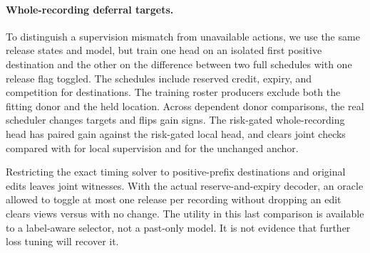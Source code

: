 \paragraph{Whole-recording deferral targets.}
To distinguish a supervision mismatch from unavailable actions, we use
the same release states and model, but train one head on an isolated
first positive destination and the other on the difference between
two full schedules with one release flag toggled. The schedules include
reserved credit, expiry, and competition for destinations. The training
roster producers exclude both the fitting donor and the held location.
Across \LedgerLabels{} dependent donor comparisons, the real scheduler
changes \LedgerChanged{} targets and flips \LedgerSigns{} gain signs.
The risk-gated whole-recording head has paired gain \LedgerEffect{}
against the risk-gated local head, and clears \LedgerJoint{} joint
checks compared with \LedgerLocal{} for local supervision and
\LedgerAnchor{} for the unchanged anchor.

Restricting the exact timing solver to positive-prefix destinations and
original edits leaves \LedgerRestricted{} joint witnesses. With the
actual reserve-and-expiry decoder, an oracle allowed to toggle at most
one release per recording without dropping an edit clears \LedgerToggle{}
views versus \LedgerAnchor{} with no change. The utility in this last
comparison is available to a label-aware selector, not a past-only model.
It is not evidence that further loss tuning will recover it.
